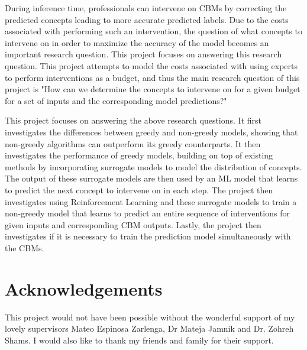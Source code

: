\documentclass[12pt,a4paper,twoside]{report}
\newif\ifsubmission %
\begin{document}
During inference time, professionals can intervene on CBMs by correcting
the predicted concepts leading to more accurate predicted labels. 
Due to the costs
associated with performing such an intervention, the question of what concepts
to intervene on in order to maximize the accuracy of the model becomes an important 
research question. This project focuses on answering this research question.
This project attempts to model the costs associated with using experts
to perform interventions as a budget, and thus the main research question 
of this project is
"How can we determine the concepts to intervene on for a given budget for 
a set of inputs and the corresponding model predictions?"

This project focuses on answering the above research questions. It first 
investigates the differences between greedy and non-greedy models, showing that non-greedy algorithms can outperform
its greedy counterparts. It then investigates
the performance of greedy models, building on top of existing methods by incorporating
 surrogate models to model the distribution
of concepts. The output of these surrogate models are then used by an ML
model that learns to predict the next concept to intervene on in each step. 
The project then investigates using Reinforcement Learning and these surrogate models to train a non-greedy model that 
learns to predict an entire sequence of interventions for given inputs and corresponding
CBM outputs.
Lastly, the project then investigates if it is necessary to train the prediction
model simultaneously with the CBMs.

\ifsubmission\else

\chapter*{Acknowledgements}

This project would not have been possible without the wonderful
support of my lovely supervisors Mateo Espinosa Zarlenga, Dr Mateja Jamnik and Dr. Zohreh Shams. I would also like to 
thank my friends and family for their support.

\fi
\cleardoublepage %

\tableofcontents
\listoffigures
\listoftables



\pagestyle{headings}
\label{lastcontentpage}







\label{lastpage}

\end{document}
